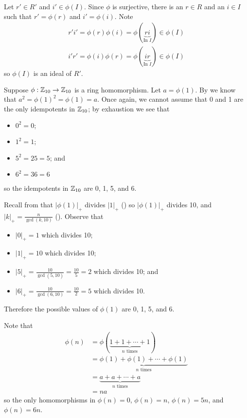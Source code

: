 \begin{questions}
\begin{partquestions}{\alph*}
        Let $r' \in R'$ and $i' \in \phi(I)$. Since $\phi$ is surjective, there is an $r \in R$ and an $i \in I$ such that $r' = \phi(r)$ and $i' = \phi(i)$. Note
        \begin{align*}
            r'i' = \phi(r)\phi(i) = \phi(\underbrace{ri}_{\text{In }I}) \in \phi(I)\\
            i'r' = \phi(i)\phi(r) = \phi(\underbrace{ir}_{\text{In }I}) \in \phi(I)
        \end{align*}
        so $\phi(I)$ is an ideal of $R'$.
    \end{partquestions}

    \item Suppose $\phi: \mathbb{Z}_{10}\to\mathbb{Z}_{10}$ is a ring homomorphism. Let $a = \phi(1)$. By  we know that $a^2 = \phi(1)^2 = \phi(1) = a$. Once again, we cannot assume that 0 and 1 are the only idempotents in $\mathbb{Z}_{10}$; by exhaustion we see that
    \begin{itemize}
        \item $0^2 = 0$;
        \item $1^2 = 1$;
        \item $5^2 = 25 = 5$; and
        \item $6^2 = 36 = 6$
    \end{itemize}
    so the idempotents in $\mathbb{Z}_{10}$ are 0, 1, 5, and 6.

    Recall from  that $|\phi(1)|_+$ divides $|1|_+$ () so $|\phi(1)|_+$ divides 10, and $|k|_+ = \frac{n}{\gcd(k,10)}$ (). Observe that
    \begin{itemize}
        \item $|0|_+ = 1$ which divides 10;
        \item $|1|_+ = 10$ which divides 10;
        \item $|5|_+ = \frac{10}{\gcd(5,10)} = \frac{10}{5} = 2$ which divides 10; and
        \item $|6|_+ = \frac{10}{\gcd(6,10)} = \frac{10}{2} = 5$ which divides 10.
    \end{itemize}
    Therefore the possible values of $\phi(1)$ are 0, 1, 5, and 6.

    Note that
    \begin{align*}
        \phi(n) &= \phi(\underbrace{1+1+\cdots+1}_{n \text{ times}})\\
        &= \underbrace{\phi(1)+\phi(1)+\cdots+\phi(1)}_{n \text{ times}}\\
        &= \underbrace{a + a + \cdots + a}_{n \text{ times}}\\
        &= na
    \end{align*}
    so the only homomorphisms in $\phi(n) = 0$, $\phi(n) = n$, $\phi(n) = 5n$, and $\phi(n) = 6n$.


\end{questions}

